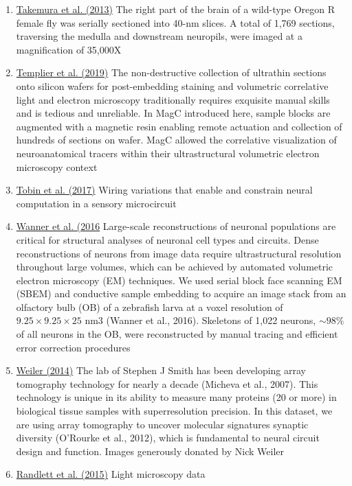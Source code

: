 \documentclass[10pt,colorlinks=true,urlcolor=blue]{moderncv}
\begin{document}
\begin{enumerate}
    \item \href{https://neurodata.io/data/takemura13}{Takemura et al. (2013)} 
        The right part of the brain of a wild-type Oregon R female fly was serially sectioned into 40-nm slices. A total of 1,769 sections, traversing the medulla and downstream neuropils, were imaged at a magnification of 35,000X%

    \item \href{https://neurodata.io/data/templier2019}{Templier et al.  (2019)} 
        The non-destructive collection of ultrathin sections onto silicon wafers for post-embedding staining and volumetric correlative light and electron microscopy traditionally requires exquisite manual skills and is tedious and unreliable. In MagC introduced here, sample blocks are augmented with a magnetic resin enabling remote actuation and collection of hundreds of sections on wafer. MagC allowed the correlative visualization of neuroanatomical tracers within their ultrastructural volumetric electron microscopy context%

    \item \href{https://neurodata.io/data/tobin17}{Tobin et al. (2017)}
	Wiring variations that enable and constrain neural computation in a sensory microcircuit%

    \item \href{https://neurodata.io/data/wanner16}{Wanner et al. (2016}
        Large-scale reconstructions of neuronal populations are critical for structural analyses of neuronal cell types and circuits.  Dense reconstructions of neurons from image data require ultrastructural resolution throughout large volumes, which can be achieved by automated volumetric electron microscopy (EM) techniques. We used serial block face scanning EM (SBEM) and conductive sample embedding to acquire an image stack from an olfactory bulb (OB) of a zebrafish larva at a voxel resolution of $9.25 \times 9.25 \times 25$ nm3 (Wanner et al., 2016).  Skeletons of 1,022 neurons, $\sim98\%$ of all neurons in the OB, were reconstructed by manual tracing and efficient error correction procedures%

    \item \href{https://neurodata.io/data/weiler14}{Weiler (2014)}
        The lab of Stephen J Smith has been developing array tomography technology for nearly a decade (Micheva et al., 2007). This technology is unique in its ability to measure many proteins (20 or more) in biological tissue samples with superresolution precision. In this dataset, we are using array tomography to uncover molecular signatures synaptic diversity (O'Rourke et al., 2012), which is fundamental to neural circuit design and function. Images generously donated by Nick Weiler%

    \item \href{https://neurodata.io/data/zbrain_atlas}{Randlett et al. (2015)}
        Light microscopy data%
\end{enumerate}
\end{document}
